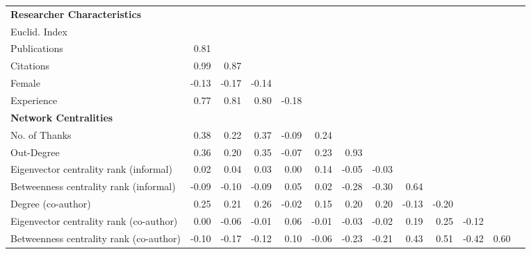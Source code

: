 \begin{tabular}{l|rrrrrrrrrrrr}
\toprule
{\bfseries Researcher Characteristics}&&&&&&&&&&&&\tabularnewline
Euclid. Index&&&&&&&&&&&&\tabularnewline
Publications& 0.81&&&&&&&&&&&\tabularnewline
Citations& 0.99& 0.87&&&&&&&&&&\tabularnewline
Female&-0.13&-0.17&-0.14&&&&&&&&&\tabularnewline
Experience& 0.77& 0.81& 0.80&-0.18&&&&&&&&\tabularnewline
\midrule
{\bfseries Network Centralities}&&&&&&&&&&&&\tabularnewline
No. of Thanks& 0.38& 0.22& 0.37&-0.09& 0.24&&&&&&&\tabularnewline
Out-Degree& 0.36& 0.20& 0.35&-0.07& 0.23& 0.93&&&&&&\tabularnewline
Eigenvector centrality rank (informal)& 0.02& 0.04& 0.03& 0.00& 0.14&-0.05&-0.03&&&&&\tabularnewline
Betweenness centrality rank (informal)&-0.09&-0.10&-0.09& 0.05& 0.02&-0.28&-0.30& 0.64&&&&\tabularnewline
Degree (co-author)& 0.25& 0.21& 0.26&-0.02& 0.15& 0.20& 0.20&-0.13&-0.20&&&\tabularnewline
Eigenvector centrality rank (co-author)& 0.00&-0.06&-0.01& 0.06&-0.01&-0.03&-0.02& 0.19& 0.25&-0.12&&\tabularnewline
Betweenness centrality rank (co-author)&-0.10&-0.17&-0.12& 0.10&-0.06&-0.23&-0.21& 0.43& 0.51&-0.42&0.60&\tabularnewline
\bottomrule
\end{tabular}
